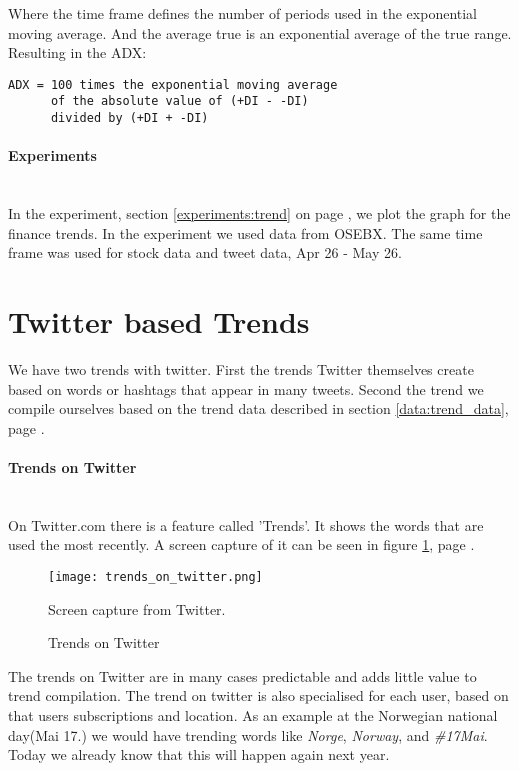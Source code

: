 Where the time frame defines the number of periods used in the exponential
moving average. And the average true is an exponential average of the true
range. Resulting in the ADX:
\begin{verbatim}
ADX = 100 times the exponential moving average 
      of the absolute value of (+DI - -DI) 
      divided by (+DI + -DI)
\end{verbatim}
%

\paragraph{Experiments}
\hspace{0pt}\\
In the experiment, section \ref{experiments:trend} on page
\pageref{experiments:trend}, we plot the graph for
the finance trends. In the experiment we used data from OSEBX. The same time
frame was used for stock data and tweet data, Apr 26 - May 26.
%

\section{Twitter based Trends}\label{trend:trends_on_twitter}
We have two trends with twitter. First the trends Twitter themselves
create based on words or hashtags that appear in many tweets. Second the trend we
compile ourselves based on the trend data described in section
\ref{data:trend_data}, page \pageref{data:trend_data}. 

\paragraph{Trends on Twitter}
\hspace{0pt}\\
On Twitter.com there is a feature called 'Trends'. It shows the words that are
used the most recently. A screen capture of it can be seen in figure
\ref{fig:trends_on_twitter}, page \pageref{fig:trends_on_twitter}.

\begin{figure}[htb]
	\centering
    \texttt{[image: trends\_on\_twitter.png]}
    \label{fig:trends_on_twitter}
    \caption{Trends on Twitter}
Screen capture from Twitter.
\end{figure}

The trends on Twitter are in many cases predictable and adds little value to trend
compilation. The trend on twitter is also specialised for each user, based on
that users subscriptions and location. As an example at the Norwegian national
day(Mai 17.) we would have trending words like \textit{Norge}, \textit{Norway},
and \textit{\#17Mai}. Today we already know that this will happen again next year. 
%

